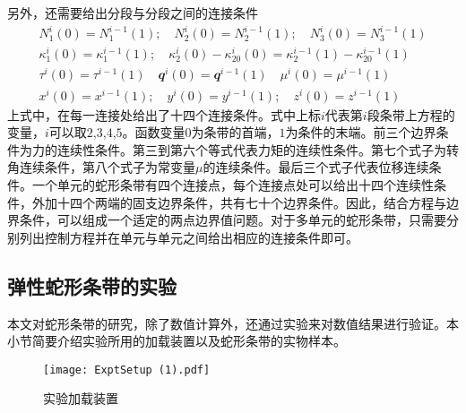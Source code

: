 另外，还需要给出分段与分段之间的连接条件
\begin{equation}
	\begin{gathered}
		N^i_1(0)=N^{i-1}_1(1);\quad N^i_2(0)=N^{i-1}_2(1);\quad N^i_3(0)=N^{i-1}_3(1)\\
		\kappa^i_{1}(0)=\kappa^{i-1}_{1}(1);\quad \kappa^i_{2}(0)-\kappa^i_{20}(0)=\kappa^{i-1}_{2}(1)-\kappa^{i-1}_{20}(1)\\
		\tau^{i}(0)=\tau^{i-1}(1) \quad \mathbfit{q}^{i}(0)=\mathbfit{q}^{i-1}(1) \quad \mu^{i}(0)=\mu^{i-1}(1)\\
		x^i(0)=x^{i-1}(1);\quad y^i(0)=y^{i-1}(1);\quad z^i(0)=z^{i-1}(1)
	\end{gathered}
\end{equation}
上式中，在每一连接处给出了十四个连接条件。式中上标$i$代表第$i$段条带上方程的变量，$i$可以取$2$,$3$,$4$,$5$。函数变量$0$为条带的首端，$1$为条件的末端。前三个边界条件为力的连续性条件。第三到第六个等式代表力矩的连续性条件。第七个式子为转角连续条件，第八个式子为常变量$\mu$的连续条件。最后三个式子代表位移连续条件。一个单元的蛇形条带有四个连接点，每个连接点处可以给出十四个连续性条件，外加十四个两端的固支边界条件，共有七十个边界条件。因此，结合方程与边界条件，可以组成一个适定的两点边界值问题。对于多单元的蛇形条带，只需要分别列出控制方程并在单元与单元之间给出相应的连接条件即可。

\subsection{弹性蛇形条带的实验}
本文对蛇形条带的研究，除了数值计算外，还通过实验来对数值结果进行验证。本小节简要介绍实验所用的加载装置以及蛇形条带的实物样本。
\begin{figure}
	\centering
	\texttt{[image: ExptSetup (1).pdf]}
	\caption{实验加载装置}
	\label{fig:ExptSetup}
\end{figure}

